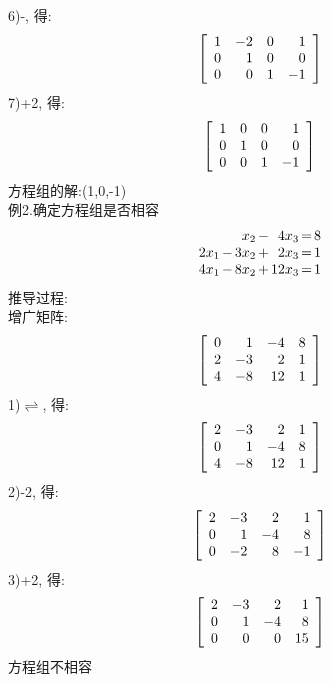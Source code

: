 6)-, 得:\\
\[\left[\begin{array}{r r r r r} 
	1 & -2 & 0 & 1\\
	0 & 1 & 0 & 0\\
	0 & 0 & 1 & -1
\end{array}\right]\]
7)+2, 得:\\
\[\left[\begin{array}{r r r r r} 
	1 & 0 & 0 & 1\\
	0 & 1 & 0 & 0\\
	0 & 0 & 1 & -1
\end{array}\right]\]
方程组的解:(1,0,-1)\\[1ex]

例2.确定方程组是否相容\\
\[\begin{array}{r@{\hspace{1.5pt}}l@{\hspace{1.5pt}}r@{\hspace{1.5pt}}l@{\hspace{1.5pt}}r@{\hspace{1.5pt}}l@{\hspace{1.5pt}}r}
	& & x_2 & - & 4x_3 & = & 8\\
	2x_1& - & 3x_2 & + & 2x_3 & = & 1\\
	4x_1 & - & 8x_2 & + & 12x_3 & = & 1
\end{array}\]
推导过程:\\
增广矩阵:\\
\[\left[\begin{array}{r r r r}
	0 & 1 & -4 & 8\\
	2 & -3 & 2 & 1\\
	4 & -8 & 12 & 1
\end{array}\right]\]
1)$\rightleftharpoons$, 得:\\
\[\left[\begin{array}{r r r r}
	2 & -3 & 2 & 1\\
	0 & 1 & -4 & 8\\
	4 & -8 & 12 & 1
\end{array}\right]\]
2)-2, 得:\\
\[\left[\begin{array}{r r r r}
	2 & -3 & 2 & 1\\
	0 & 1 & -4 & 8\\
	0 & -2 & 8 & -1
\end{array}\right]\]
3)+2, 得:\\
\[\left[\begin{array}{r r r r}
	2 & -3 & 2 & 1\\
	0 & 1 & -4 & 8\\
	0 & 0 & 0 & 15
\end{array}\right]\]
方程组不相容\\[1ex]

